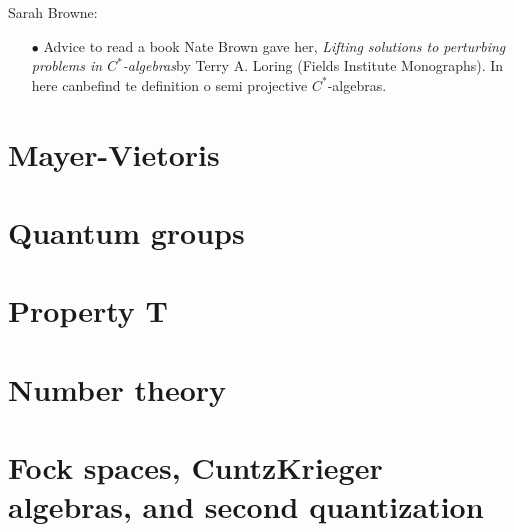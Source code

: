 Sarah Browne:\\

\begin{itemize}
\item[$\bullet$] Advice to read a book Nate Brown gave her, \textit{Lifting solutions to perturbing problems in $C^*$-algebras}by Terry A. Loring (Fields Institute Monographs). In here canbefind te definition o semi projective $C^*$-algebras.
\end{itemize}

\section{Mayer-Vietoris}

\section{Quantum groups}

\section{Property T}

\section{Number theory}

\section{Fock spaces, CuntzKrieger algebras, and second quantization}












